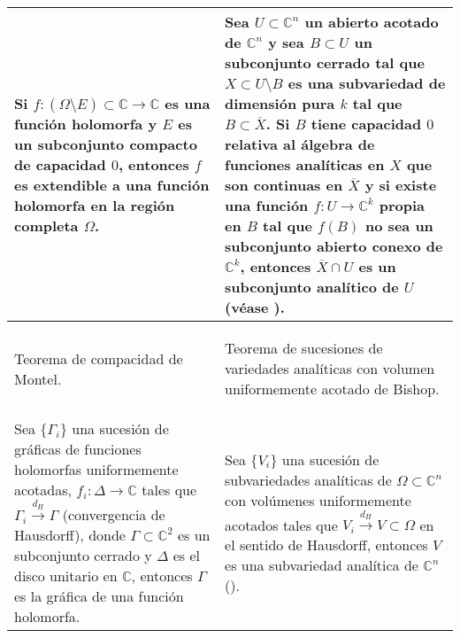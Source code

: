 \documentclass{article}
\newcommand{\co}{\ensuremath{\mathbb C }}
\newcommand{\con}{\ensuremath{\mathbb{C}^n}}
\begin{document}
\begin{table}[hpt]
\begin{tabular}{|m{5.5cm}|m{5.5cm}|}
                        \hline Si $f:(\Omega\setminus E)\subset\co\rightarrow\co$ es una funci\'on holomorfa y $E$ es un subconjunto
                        compacto de capacidad $0$, entonces $f$ es extendible a una funci\'on holomorfa
                        en la regi\'on completa $\Omega$.
                        &
                        \vspace{0.1cm}
                        Sea $U\subset\con$ un abierto acotado de $\con$ y sea $B\subset U$ un subconjunto cerrado
                        tal que $X\subset U\setminus B$ es una subvariedad de dimensi\'on pura $k$ tal que $B\subset\overline{X}$. 
                        Si $B$ tiene capacidad $0$ relativa al \'algebra de funciones anal\'iticas en $X$ que son
                        continuas en $\overline{X}$ y si existe una funci\'on $f:U\rightarrow\co^k$ propia en $B$ tal que $f(B)$ 
                        no sea un subconjunto abierto conexo de $\co^k$, entonces $\overline{X}\cap U$ es un subconjunto anal\'itico
                        de $U$ (v\'ease \cite[teorema 4]{Bishop}).\\ 
                        \hline 
                \begin{center} 
                        Teorema de compacidad de Montel. 
                \end{center} 
                        & 
                \begin{center}
                Teorema de sucesiones de variedades anal\'iticas con volumen uniformemente acotado de Bishop.
                \end{center}\\
                \hline 
                \vspace{0.1cm}
                Sea $\lbrace\Gamma_i\rbrace$ una sucesi\'on de gr\'aficas de funciones holomorfas uniformemente  
                acotadas, $f_i:\Delta\rightarrow\co$ tales que $\Gamma_i\overset{d_H}\longrightarrow\Gamma$ (convergencia de Hausdorff), 
                donde $\Gamma\subset\co^2$ es un subconjunto cerrado y $\Delta$ es el disco unitario en $\co$, 
                entonces $\Gamma$ es la gr\'afica de una funci\'on holomorfa.  
                        & 
                Sea $\lbrace V_i\rbrace$ una sucesi\'on de subvariedades anal\'iticas de $\Omega\subset\con$ con vol\'umenes 
                uniformemente acotados tales que $V_i\overset{d_H}\longrightarrow V\subset\Omega$ en el sentido de Hausdorff, entonces 
                $V$ es una subvariedad anal\'itica de $\con$ (\cite[p. 30]{Stolzenberg}). \\ \hline         
        \end{tabular} 
\end{table}
\end{document}
